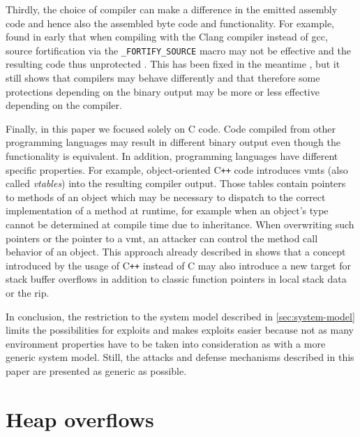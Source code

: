 Thirdly, the choice of compiler can make a difference in the emitted assembly code and hence also the assembled byte code and functionality.
For example, \citeauthor{Guelton2020} found in early \citeyear{Guelton2020} that when compiling with the Clang compiler instead of \gls{gcc}, source fortification via the \texttt{\_FORTIFY\_SOURCE} macro may not be effective and the resulting code thus unprotected \cite{Guelton2020}.
This has been fixed in the meantime \cite{Guelton2020a}, but it still shows that compilers may behave differently and that therefore some protections depending on the binary output may be more or less effective depending on the compiler.

Finally, in this paper we focused solely on C code.
Code compiled from other programming languages may result in different binary output even though the functionality is equivalent.
In addition, programming languages have different specific properties.
For example, object-oriented C\texttt{++} code introduces \glspl{vmt} (also called \emph{vtables}) into the resulting compiler output.
Those tables contain pointers to methods of an object which may be necessary to dispatch to the correct implementation of a method at runtime, for example when an object's type cannot be determined at compile time due to inheritance.
When overwriting such pointers or the pointer to a \gls{vmt}, an attacker can control the method call behavior of an object.
This approach already described in \citeyear{rix2000} \cite{rix2000} shows that a concept introduced by the usage of C\texttt{++} instead of C may also introduce a new target for stack buffer overflows in addition to classic function pointers in local stack data or the \acrfull{rip}.

In conclusion, the restriction to the system model described in \cref{sec:system-model} limits the possibilities for exploits and makes exploits easier because not as many environment properties have to be taken into consideration as with a more generic system model.
Still, the attacks and defense mechanisms described in this paper are presented as generic as possible.

\section{Heap overflows}
\label{sec:heap-overflows}

